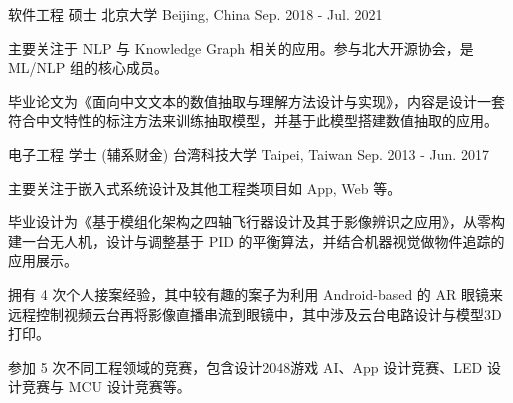 

\begin{cventries}

  \cventry
    {软件工程 硕士} %
    {北京大学} %
    {Beijing, China} %
    {Sep. 2018 - Jul. 2021} %
    {
      \begin{cvitems} %
        \item {主要关注于 NLP 与 Knowledge Graph 相关的应用。参与北大开源协会，是 ML/NLP 组的核心成员。}
        \item {毕业论文为《面向中文文本的数值抽取与理解方法设计与实现》，内容是设计一套符合中文特性的标注方法来训练抽取模型，并基于此模型搭建数值抽取的应用。}
      \end{cvitems}
    }


  \cventry
    {电子工程 学士 (辅系财金)} %
    {台湾科技大学} %
    {Taipei, Taiwan} %
    {Sep. 2013 - Jun. 2017} %
    {
      \begin{cvitems} %
        \item {主要关注于嵌入式系统设计及其他工程类项目如 App, Web 等。}
        \item {毕业设计为《基于模组化架构之四轴飞行器设计及其于影像辨识之应用》，从零构建一台无人机，设计与调整基于 PID 的平衡算法，并结合机器视觉做物件追踪的应用展示。}
        \item {拥有 4 次个人接案经验，其中较有趣的案子为利用 Android-based 的 AR 眼镜来远程控制视频云台再将影像直播串流到眼镜中，其中涉及云台电路设计与模型3D打印。}
        \item {参加 5 次不同工程领域的竞赛，包含设计2048游戏 AI、App 设计竞赛、LED 设计竞赛与 MCU 设计竞赛等。}
      \end{cvitems}
    }

\end{cventries}
